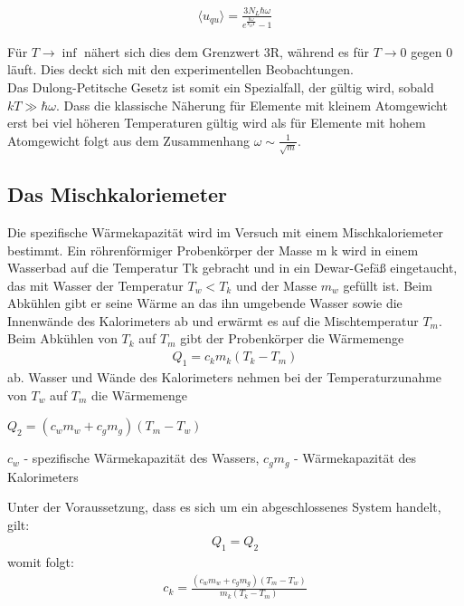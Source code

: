 \begin{align}
\langle u_{qu} \rangle = \frac{3N_L\hbar\omega}{e^{\frac{\hbar \omega}{k_BT}}-1}
\end{align}

Für $T\rightarrow\inf$ nähert sich dies dem Grenzwert 3R, während es für $T\rightarrow 0$ gegen 0 läuft. Dies deckt sich mit den experimentellen Beobachtungen.\\

Das Dulong-Petitsche Gesetz ist somit ein Spezialfall, der gültig wird, sobald $kT \gg \hbar \omega$. 
Dass die klassische Näherung für Elemente mit kleinem Atomgewicht erst bei viel höheren Temperaturen gültig wird als für Elemente mit hohem Atomgewicht folgt aus dem Zusammenhang $\omega \sim \frac{1}{\sqrt{m}}$.

\subsection{Das Mischkaloriemeter}
Die spezifische Wärmekapazität wird im Versuch mit einem Mischkaloriemeter bestimmt. Ein röhrenförmiger Probenkörper der Masse m k wird in einem Wasserbad auf die Temperatur Tk gebracht und in ein Dewar-Gefäß eingetaucht, das mit Wasser der Temperatur $T_w < T_k$ und der Masse $m_w$ gefüllt ist. Beim Abkühlen gibt er seine Wärme an das ihn umgebende Wasser sowie die Innenwände des Kalorimeters ab und erwärmt es auf die Mischtemperatur $T_m$.
Beim Abkühlen von $T_k$ auf $T_m$ gibt der Probenkörper die Wärmemenge
\begin{align*}
Q_1=c_km_k (T_k-T_m)
\end{align*}
ab. Wasser und Wände des Kalorimeters nehmen bei der Temperaturzunahme von $T_w$ auf $T_m$ die Wärmemenge
\begin{formel}[H]
\centering
$Q_2 = (c_wm_w+c_gm_g) (T_m - T_w)$
\caption*{\small{$c_w$ - spezifische Wärmekapazität des Wassers, $c_gm_g$ - Wärmekapazität des Kalorimeters}}
\end{formel}
Unter der Voraussetzung, dass es sich um ein abgeschlossenes System handelt, gilt:
\begin{align*}
Q_1 = Q_2
\end{align*}
womit folgt:
\begin{align}
c_k = \frac{(c_wm_w+c_gm_g)(T_m - T_w)}{m_k (T_k - T_m)}
\label{eq_ck}
\end{align}

